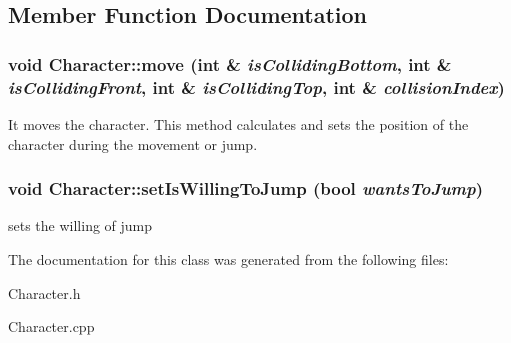 \subsection{Member Function Documentation}
\hypertarget{classCharacter_a20727808aa2d7c646c7fe209801bae1f}{
\subsubsection[{move}]{\setlength{\rightskip}{0pt plus 5cm}void Character::move (int \& {\em isCollidingBottom}, \/  int \& {\em isCollidingFront}, \/  int \& {\em isCollidingTop}, \/  int \& {\em collisionIndex})}}
\label{classCharacter_a20727808aa2d7c646c7fe209801bae1f}


It moves the character. This method calculates and sets the position of the character during the movement or jump. \hypertarget{classCharacter_a79111ebd8a8da953f15312adde87bec9}{
\subsubsection[{setIsWillingToJump}]{\setlength{\rightskip}{0pt plus 5cm}void Character::setIsWillingToJump (bool {\em wantsToJump})}}
\label{classCharacter_a79111ebd8a8da953f15312adde87bec9}
sets the willing of jump 

The documentation for this class was generated from the following files:\begin{DoxyCompactItemize}
\item 
Character.h\item 
Character.cpp\end{DoxyCompactItemize}
